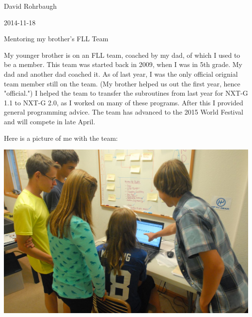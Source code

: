 David Rohrbaugh

2014-11-18

Mentoring my brother's FLL Team

\medskip

My younger brother is on an FLL team, coached by my dad, of which I used to be a member. This team was started back in 2009, when I was in 5th grade. My dad and another dad coached it. As of last year, I was the only official orignial team member still on the team. (My brother helped us out the first year, hence "official.") I helped the team to transfer the subroutines from last year for NXT-G 1.1 to NXT-G 2.0, as I worked on many of these programs. After this I provided general programming advice. The team has advanced to the 2015 World Festival and will compete in late April.

\medskip

Here is a picture of me with the team:

\begin{center}
 \includegraphics[width=\textwidth]{./Entries/Images/mentoring.jpg}
\end{center}
